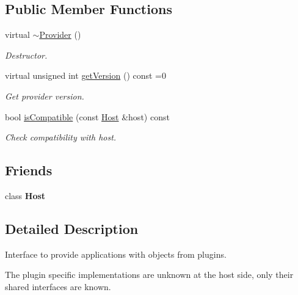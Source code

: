 \subsection*{Public Member Functions}
\begin{DoxyCompactItemize}
\item 
virtual \hyperlink{classpluma_1_1_provider_a111a1db902d6372282f8407c9d845c21}{$\sim$\+Provider} ()\hypertarget{classpluma_1_1_provider_a111a1db902d6372282f8407c9d845c21}{}\label{classpluma_1_1_provider_a111a1db902d6372282f8407c9d845c21}

\begin{DoxyCompactList}\small\item\em Destructor. \end{DoxyCompactList}\item 
virtual unsigned int \hyperlink{classpluma_1_1_provider_a2053501ab733fc5f8ddfaf76032c82cb}{get\+Version} () const  =0
\begin{DoxyCompactList}\small\item\em Get provider version. \end{DoxyCompactList}\item 
bool \hyperlink{classpluma_1_1_provider_a192ea5a17a8fe9de1f3ba6572f44f266}{is\+Compatible} (const \hyperlink{classpluma_1_1_host}{Host} \&host) const 
\begin{DoxyCompactList}\small\item\em Check compatibility with host. \end{DoxyCompactList}\end{DoxyCompactItemize}
\subsection*{Friends}
\begin{DoxyCompactItemize}
\item 
class {\bfseries Host}\hypertarget{classpluma_1_1_provider_a912b690126957a1ad90d0c373a4ad4d0}{}\label{classpluma_1_1_provider_a912b690126957a1ad90d0c373a4ad4d0}

\end{DoxyCompactItemize}


\subsection{Detailed Description}
Interface to provide applications with objects from plugins. 

The plugin specific implementations are unknown at the host side, only their shared interfaces are known.

